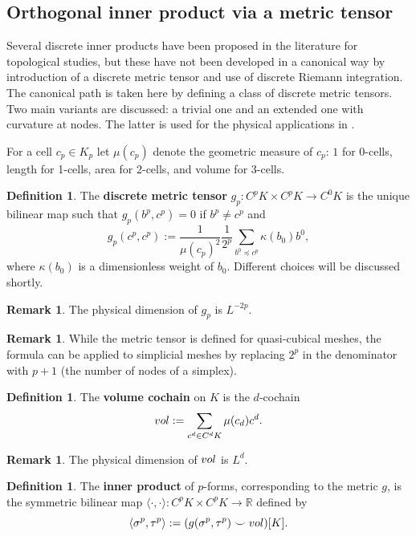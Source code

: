 \documentclass{elsarticle}
\theoremstyle{definition}
\newtheorem{definition}[theorem]{Definition}
\newtheorem{remark}[theorem]{Remark}
\newcommand{\R}{\mathbb{R}} %
\newcommand{\inner}[2]{\langle#1,#2\rangle}
\newcommand{\vol}{\mathop{\rm vol}\nolimits} %
\begin{document}
\subsection{Orthogonal inner product via a metric tensor}
\label{sec:metric_tensor}
Several discrete inner products have been proposed in the literature for topological studies, but these have not been developed in a canonical way by introduction of a discrete metric tensor and use of discrete Riemann integration. The canonical path is taken here by defining a class of discrete metric tensors. Two main variants are discussed: a trivial one and an extended one with curvature at nodes. The latter is used for the physical applications in .

For a cell $c_p \in K_p$ let $\mu(c_p)$ denote the geometric measure of $c_p$: $1$ for 0-cells, length for 1-cells, area for 2-cells, and volume for 3-cells.
\begin{definition}
  The \textbf{discrete metric tensor} $g_p \colon C^p K \times C^p K \to C^0 K$ is the unique bilinear map such that $g_p(b^p, c^p) = 0$ if $b^p \neq c^p$ and
  \begin{equation}
    g_p(c^p, c^p) := \frac{1}{\mu(c_p)^2} \frac{1}{2^p} \sum_{b^0 \preceq c^p} \kappa(b_0) b^0,
  \end{equation}
  where $\kappa(b_0)$ is a dimensionless weight of $b_0$. Different choices will be discussed shortly.
\end{definition}
\begin{remark}
  The physical dimension of $g_p$ is $L^{-2 p}$.
\end{remark}
\begin{remark} 
  While the metric tensor is defined for quasi-cubical meshes, the formula can be applied to simplicial meshes by replacing $2^p$ in the denominator with $p + 1$ (the number of nodes of a simplex).
\end{remark}
\begin{definition}
  The \textbf{volume cochain} on $K$ is the $d$-cochain
  \begin{equation}
    \vol := \sum_{c^d \in C^d K} \mu(c_d) c^d.
  \end{equation}
\end{definition}
\begin{remark}
  The physical dimension of $\vol$ is $L^d$. 
\end{remark}
\begin{definition}
\label{thm:inner_product}
  The \textbf{inner product} of $p$-forms, corresponding to the metric $g$, is the symmetric bilinear map $\inner{\cdot}{\cdot} \colon C^{p} K \times C^{p} K \to \R$ defined by
  \begin{equation}
    \inner{\sigma^p}{\tau^p} := (g(\sigma^{p}, \tau^{p}) \smile \vol)[K].
  \end{equation}
\end{definition}
\end{document}

